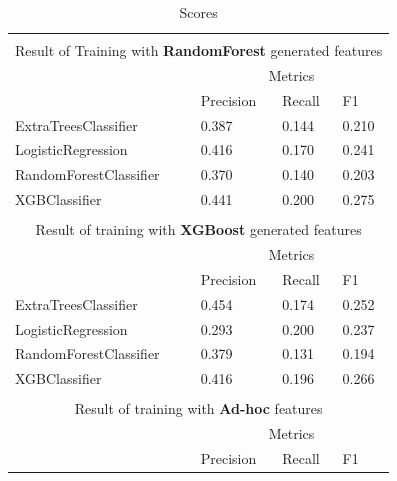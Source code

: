 \documentclass[titlepage,numbers=noenddot,headinclude,%
               footinclude=true,abstractoff,BCOR=5mm,%
               paper=a4,fontsize=11pt,ngerman,american]{scrreprt}
\numberwithin{theorem}{chapter}
\numberwithin{definition}{chapter}
\numberwithin{algorithm}{chapter}
\numberwithin{figure}{chapter}
\numberwithin{table}{chapter}
\numberwithin{equation}{chapter}
\begin{document}
\setlength{\extrarowheight}{1.5pt}
\begin{table}[!htbp]
\caption{Scores} %
\centering %
\begin{tabular}{|p{6cm}|p{1.5cm}|p{1.5cm}|p{1.5cm}|} %
\hline %
\multicolumn{4}{|c|}{}\\
\multicolumn{4}{|c|}{Result of Training with \textbf{RandomForest} generated features}\\[5pt]
\hline
& \multicolumn{3}{c|}{Metrics}\\[5pt]
\cline{2-4}
& Precision & Recall & F1\\[0.5ex]
\hline %

ExtraTreesClassifier     &  0.387       &  0.144     &  0.210     \\
LogisticRegression       &  0.416       &  0.170     &  0.241     \\
RandomForestClassifier   &  0.370       &  0.140     &  0.203     \\
XGBClassifier            &  0.441       &  0.200     &  0.275     \\


\hline%

\multicolumn{4}{|c|}{}\\
\multicolumn{4}{|c|}{Result of training with \textbf{XGBoost} generated features}\\[5pt]
\hline
& \multicolumn{3}{c|}{Metrics}\\[5pt]
\cline{2-4}
& Precision & Recall & F1\\[0.5ex]
\hline %

ExtraTreesClassifier     & 0.454       & 0.174     & 0.252\\
LogisticRegression       & 0.293       & 0.200     & 0.237\\
RandomForestClassifier   & 0.379       & 0.131     & 0.194\\
XGBClassifier            & 0.416       & 0.196     & 0.266\\

\hline%

\multicolumn{4}{|c|}{}\\
\multicolumn{4}{|c|}{Result of training with \textbf{Ad-hoc} features}\\[5pt]
\hline
& \multicolumn{3}{c|}{Metrics}\\[5pt]
\cline{2-4}
& Precision & Recall & F1\\[0.5ex]
\hline %


\end{tabular}
\end{table}
\end{document}
